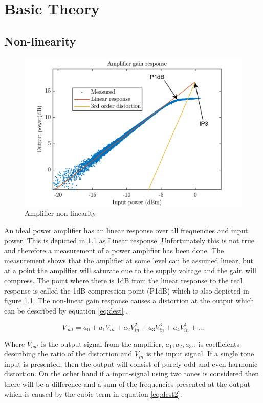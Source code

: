 \chapter{Basic Theory}\label{ch:2}

\section{Non-linearity}

\begin{figure}[H]
\centering 
\includegraphics[scale = 0.8]{figures/ch1/amp_lin.png}
\caption{Amplifier non-linearity}
\label{fig:amp_lin}
\end{figure} 

An ideal power amplifier has an linear response over all frequencies and input power. This is depicted in \ref{fig:amp_lin} as Linear response. Unfortunately this is not true and therefore a measurement of a power amplifier has been done. The measurement shows that the amplifier at some level can be assumed linear, but at a point the amplifier will saturate due to the supply voltage and the gain will compress. The point where there is 1dB from the linear response to the real response is called the 1dB compression point (P1dB) which is also depicted in  figure \ref{fig:amp_lin}. The non-linear gain response causes a distortion at the output which can be described by equation \ref{eq:dest} \citep{NI}. 

\begin{equation} \label{eq:dest}
V_{out} = a_0 + a_1 V_{in} + a_2 V_{in}^2 + a_3 V_{in}^3 + a_4 V_{in}^4 + ... 
\end{equation}

Where $V_{out}$ is the output signal from the amplifier, $a_1, a_2 ,a_3..$ is coefficients describing the ratio of the distortion and $V_{in}$ is the input signal. If a single tone input is presented, then the output will consist of purely odd and even harmonic distortion. On the other hand if a input-signal using two tones is considered then there will be a difference and a sum of the frequencies presented at the output which is caused by the cubic term in equation \ref{eq:dest2}. 

